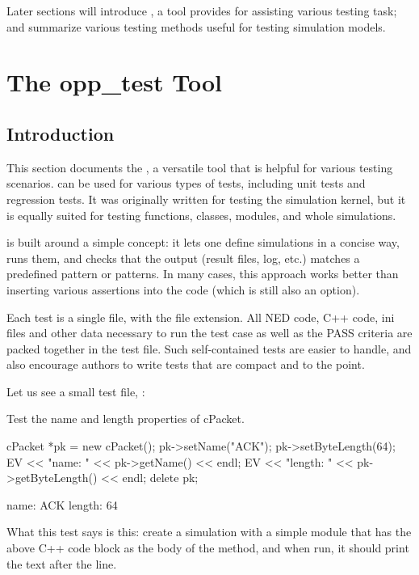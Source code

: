 Later sections will introduce , a tool {\opp} provides
for assisting various testing task; and summarize various testing methods
useful for testing simulation models.


\section{The opp\_test Tool}
\label{sec:testing:opptest}

\subsection{Introduction}
\label{sec:testing:opptest:introduction}

This section documents the , a versatile tool that is
helpful for various testing scenarios.  can be used for
various types of tests, including unit tests and regression tests. It was
originally written for testing the {\opp} simulation kernel, but it is
equally suited for testing functions, classes, modules, and whole
simulations.

 is built around a simple concept: it lets one define
simulations in a concise way, runs them, and checks that the output (result
files, log, etc.) matches a predefined pattern or patterns. In many cases,
this approach works better than inserting various assertions into the code
(which is still also an option).

Each test is a single file, with the  file extension. All NED
code, C++ code, ini files and other data necessary to run the test case as
well as the PASS criteria are packed together in the test file. Such
self-contained tests are easier to handle, and also encourage authors to
write tests that are compact and to the point.

Let us see a small test file, :

\begin{filelisting}
Test the name and length properties of cPacket.

cPacket *pk = new cPacket();
pk->setName("ACK");
pk->setByteLength(64);
EV << "name: " << pk->getName() << endl;
EV << "length: " << pk->getByteLength() << endl;
delete pk;

name: ACK
length: 64
\end{filelisting}

What this test says is this: create a simulation with a simple module
that has the above C++ code block as the body of the  method,
and when run, it should print the text after the  line.

